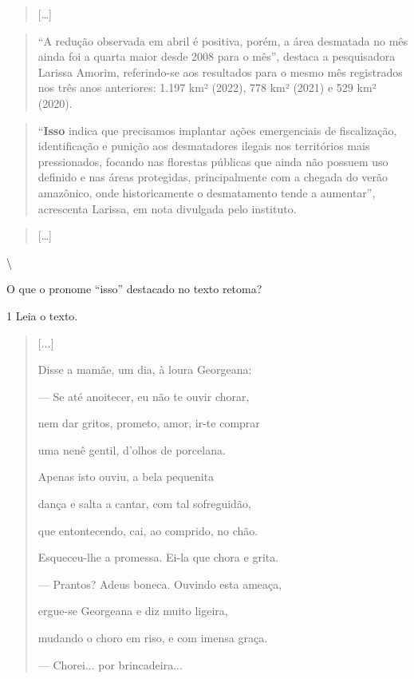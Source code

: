 \begin{quote}
{[}\ldots{]}
\end{quote}

\begin{quote}
``A redução observada em abril é positiva, porém, a área desmatada no
mês ainda foi a quarta maior desde 2008 para o mês'', destaca a
pesquisadora Larissa Amorim, referindo-se aos resultados para o mesmo
mês registrados nos três anos anteriores: 1.197 km² (2022), 778 km²
(2021) e 529 km² (2020).
\end{quote}

\begin{quote}
``\textbf{Isso} indica que precisamos implantar ações emergenciais de
fiscalização, identificação e punição aos desmatadores ilegais nos
territórios mais pressionados, focando nas florestas públicas que ainda
não possuem uso definido e nas áreas protegidas, principalmente com a
chegada do verão amazônico, onde historicamente o desmatamento tende a
aumentar'', acrescenta Larissa, em nota divulgada pelo instituto.
\end{quote}

\begin{quote}
{[}\ldots{]}
\end{quote}

\textbackslash {}

O que o pronome ``isso'' destacado no texto retoma?



\num{1} Leia o texto.

\begin{quote}
{[}...{]}

Disse a mamãe, um dia, à loura Georgeana:

--- Se até anoitecer, eu não te ouvir chorar,

nem dar gritos, prometo, amor, ir-te comprar

uma nenê gentil, d'olhos de porcelana.

Apenas isto ouviu, a bela pequenita

dança e salta a cantar, com tal sofreguidão,

que entontecendo, cai, ao comprido, no chão.

Esqueceu-lhe a promessa. Ei-la que chora e grita.

--- Prantos? Adeus boneca. Ouvindo esta ameaça,

ergue-se Georgeana e diz muito ligeira,

mudando o choro em riso, e com imensa graça.

--- Chorei... por brincadeira...
\end{quote}

